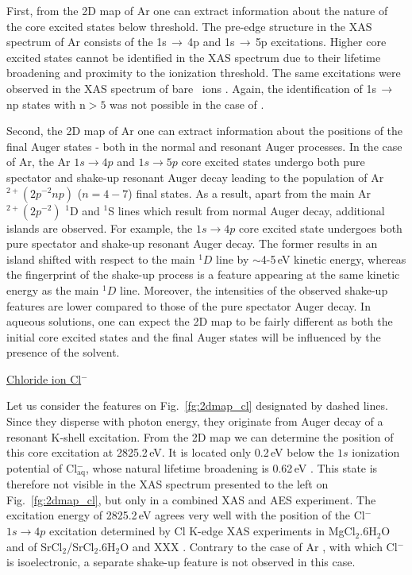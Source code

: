 First, from the 2D map of Ar one can extract information about the nature of the core excited states below threshold. The pre-edge structure in the XAS spectrum of Ar consists of the 1s$\,\rightarrow\,$4p and 1s$\,\rightarrow\,$5p excitations. Higher core excited states cannot be identified in the XAS spectrum due to their lifetime broadening and proximity to the ionization threshold. The same excitations were observed in the XAS spectrum of bare \ki~ions \citep{hertlein06:062715}. Again, the identification of 1s$\,\rightarrow\,$np states with n$> 5$ was not possible in the case of \ki.


Second, the 2D map of Ar one can extract information about the positions of the final Auger states - both in the normal and resonant Auger processes. In the case of Ar, the Ar $1s \rightarrow 4p$ and $1s \rightarrow 5p$ core excited states undergo both pure spectator and shake-up resonant Auger decay leading to the population of Ar$^{2+}(2p^{-2} np)$ ($n = 4 - 7$) final states. As a result, apart from the main Ar$^{2+}(2p^{-2})$ $^1$D and $^1$S lines which result from normal Auger decay, additional islands are observed. For example, the $1s \rightarrow 4p$ core excited state undergoes both pure spectator and shake-up resonant Auger decay. The former results in an island shifted with respect to the main $^1D$ line by $\sim$4-5\,eV kinetic energy, whereas the fingerprint of the shake-up process is a feature appearing at the same kinetic energy as the  main $^1D$ line. Moreover, the intensities of the observed shake-up features are lower compared to those of the pure spectator Auger decay. In aqueous solutions, one can expect the 2D map to be fairly different as both the initial core excited states and the final Auger states will be influenced by the presence of the solvent. 


\underline{Chloride ion Cl$^{-}$}


Let us consider the features on Fig.\ \ref{fg:2dmap_cl} designated by dashed lines. Since they disperse with photon energy, they originate from Auger decay of a resonant K-shell excitation. From the 2D map we can determine the position of this core excitation at 2825.2\,eV. It is located only 0.2\,eV below the $1s$ ionization potential of Cl$^{-}_{\text{aq}}$, whose natural lifetime broadening is 0.62\,eV \citep{Krause79:329}. This state is therefore not visible in the XAS spectrum presented to the left on Fig.\ \ref{fg:2dmap_cl}, but only in a combined XAS and AES experiment. The excitation energy of 2825.2\,eV agrees very well with the position of the Cl$^{-}$ $1s \rightarrow 4p$ excitation determined by Cl K-edge XAS experiments in MgCl$_2$.6H$_2$O and of SrCl$_2$/SrCl$_2$.6H$_2$O \citep{sugiura82:681} and XXX \citep{rompel97:4465}. Contrary to the case of Ar \citep{ceolin15:022502}, with which Cl$^{-}$ is isoelectronic, a separate shake-up feature is not observed in this case.


